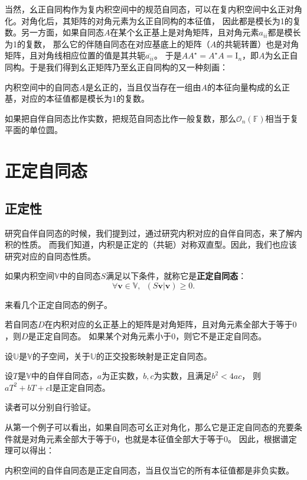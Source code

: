 \documentclass[12pt,UTF8]{ctexbook}
\begin{document}
当然，幺正自同构作为复内积空间中的规范自同态，可以在复内积空间中幺正对角化。对角化后，其矩阵的对角元素为幺正自同构的本征值，
因此都是模长为1的复数。另一方面，如果自同态$A$在某个幺正基上是对角矩阵，且对角元素$a_{ii}$都是模长为1的复数，
那么它的伴随自同态在对应基底上的矩阵（$A$的共轭转置）也是对角矩阵，且对角线相应位置的值是其共轭$\overline{a_{ii}}$。
于是$A A^\star = A^\star A = \mathrm{I}_n$，即$A$为幺正自同构。于是我们得到幺正矩阵乃至幺正自同构的又一种刻画：
\begin{pp}\label{pp:8_10}
    内积空间中的自同态$A$是幺正的，当且仅当存在一组由$A$的本征向量构成的幺正基，对应的本征值都是模长为1的复数。
\end{pp}
如果把自伴自同态比作实数，把规范自同态比作一般复数，那么$\mathcal{O}_n(\mathbb{F})$相当于复平面的单位圆。

\section{正定自同态}
\subsection{正定性}
研究自伴自同态的时候，我们提到过，通过研究内积对应的自伴自同态，来了解内积的性质。
而我们知道，内积是正定的（共轭）对称双直型。因此，我们也应该研究对应的自同态性质。
\begin{df}\label{df:8_4}
    如果内积空间$\mathbb{V}$中的自同态$S$满足以下条件，就称它是\textbf{正定自同态}：
    $$ \forall \mathbf{v} \in \mathbb{V}, \,\,\, (S\mathbf{v} | \mathbf{v}) \geqslant 0.$$
\end{df}

来看几个正定自同态的例子。

若自同态$D$在内积对应的幺正基上的矩阵是对角矩阵，且对角元素全部大于等于$0$，则$D$是正定自同态。
如果某个对角元素小于$0$，则它不是正定自同态。

设$\mathbb{U}$是$\mathbb{V}$的子空间，关于$\mathbb{U}$的正交投影映射是正定自同态。

设$T$是$\mathbb{V}$中的自伴自同态，$a$为正实数，$b, c$为实数，且满足$b^2 < 4ac$，
则$aT^2 + bT + c\mathrm{I}$是正定自同态。

读者可以分别自行验证。

从第一个例子可以看出，如果自同态可幺正对角化，那么它是正定自同态的充要条件就是对角元素全部大于等于$0$，也就是本征值全部大于等于$0$。
因此，根据谱定理可以得出：
\begin{pp}\label{pp:8_10_1}
内积空间的自伴自同态是正定自同态，当且仅当它的所有本征值都是非负实数。
\end{pp}
\end{document}
